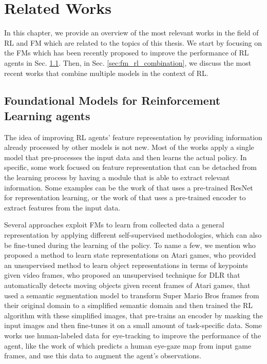 
\chapter{Related Works}
\label{ch:related_work}
In this chapter, we provide an overview of the most relevant works in the field of RL and FM which are related to the topics of this thesis\@.
We start by focusing on the FMs which has been recently proposed to improve the performance of RL agents in Sec. \ref{sec:fm_rl}.
Then, in Sec. \ref{sec:fm_rl_combination}, we discuss the most recent works that combine multiple models in the context of RL\@.

\section{Foundational Models for Reinforcement Learning agents}\label{sec:fm_rl}
The idea of improving RL agents' feature representation by providing information already processed by other models is not new.
Most of the works apply a single model that pre-processes the input data and then learns the actual policy.
In specific, some work focused on feature representation that can be detached from the learning process by having a module that is able to extract relevant information.
Some examples can be the work of \citet{shah2021rrl} that uses a pre-trained ResNet for representation learning, or the work of \citet{yuan2022pre} that uses a pre-trained encoder to extract features from the input data.

Several approaches exploit FMs to learn from collected data a general representation by applying different self-supervised methodologies, which can also be fine-tuned during the learning of the policy.
To name a few, we mention \citet{anand2019unsupervised} who proposed a method to learn state representations on Atari games, \citet{kulkarni2019unsupervised} who provided an unsupervised method to learn object representations in terms of keypoints given video frames, \citet{goel2018unsupervised} who proposed an unsupervised technique for DLR that automatically detects moving objects given recent frames of Atari games, \citet{montalvo2023exploiting} that used a semantic segmentation model to transform Super Mario Bros frames from their original domain to a simplified semantic domain and then trained the RL algorithm with these simplified images, \citet{xiao2022masked} that pre-trains an encoder by masking the input images and then fine-tunes it on a small amount of task-specific data.
Some works use human-labeled data for eye-tracking \citep{zhang2020atari} to improve the performance of the agent, like the work of \citet{thammineni2023selective} which predicts a human eye-gaze map from input game frames, and use this data to augment the agent's observations.

